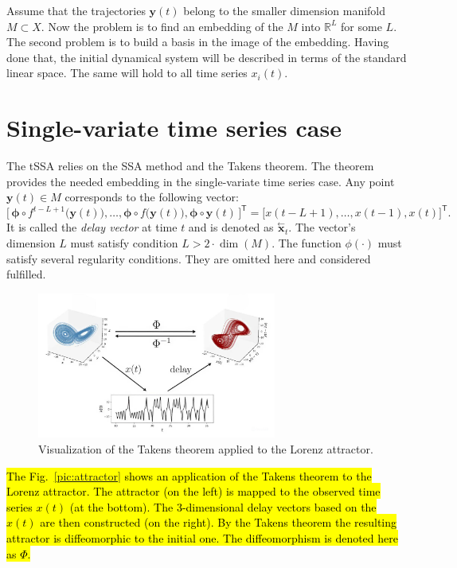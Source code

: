\documentclass[referee, pdflatex, sn-mathphys-num]{sn-jnl}
\theoremstyle{definition}
\theoremstyle{plain}
\newcommand{\delayV}[1]{\overset{\leftarrow}{\mathbf{x}}_{#1}}
\begin{document}
	Assume that the trajectories $ \mathbf{y}(t) $ belong to the smaller dimension manifold $ M \subset X $. Now the problem is to find an embedding of the $ M $ into $ \mathbb{R}^{L} $ for some $ L $. The second problem is to build a basis in the image of the embedding. Having done that, the initial dynamical system will be described in terms of the standard linear space. The same will hold to all time series $ x_i(t) $.

	\section{Single-variate time series case}\label{sec:one_series}
	
	The tSSA relies on the SSA method and the Takens theorem. The theorem provides the needed embedding in the single-variate time series case. Any point $ \mathbf{y}(t) \in M $ corresponds to the following vector: \begin{equation*}
		\bigl[ \, \boldsymbol{\phi} \circ f^{t - L + 1} \bigl( \mathbf{y}(t) \bigr), \ldots , \boldsymbol{\phi} \circ f \bigl( \mathbf{y}(t) \bigr), \boldsymbol{\phi} \circ \mathbf{y}(t) \, \bigr]^{\mathsf{T}} = \bigl[ x(t - L + 1), \ldots , x(t-1), x(t) \bigr]^{\mathsf{T}}.
	\end{equation*}	It is called the \emph{delay vector} at time $ t $ and is denoted as $ \delayV{t} $. The vector's dimension $ L $ must satisfy condition $ L > 2 \cdot \dim(M) $. The function $ \phi(\cdot) $ must satisfy several regularity conditions. They are omitted here and considered fulfilled.
	
	\begin{figure}[!htbp]
		\centering
		\includegraphics[width=0.7\textwidth, keepaspectratio]{takens_theorem.jpg}
		\caption{Visualization of the Takens theorem applied to the Lorenz attractor.}\label{pic:takens_theorem}
	\end{figure}
	
	\hl{The Fig.~{\ref{pic:attractor}} shows an application of the Takens theorem to the Lorenz attractor. The attractor (on the left) is mapped to the observed time series $x(t)$ (at the bottom). The 3-dimensional delay vectors based on the $x(t)$ are then constructed (on the right). By the Takens theorem the resulting attractor is diffeomorphic to the initial one. The diffeomorphism is denoted here as $\Phi$.}
	
\end{document}
